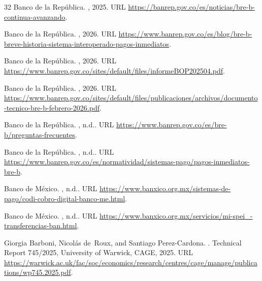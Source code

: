 \documentclass[12pt]{article}
\begin{document}
\begin{thebibliography}{32}
{Banco de la República}.
, 2025.
\newblock URL \url{https://banrep.gov.co/es/noticias/bre-b-continua-avanzando}.

{Banco de la República}.
, 2026{}.
\newblock URL \url{https://www.banrep.gov.co/es/blog/bre-b-breve-historia-sistema-interoperado-pagos-inmediatos}.

{Banco de la República}.
, 2026{}.
\newblock URL \url{https://www.banrep.gov.co/sites/default/files/informeBOP202504.pdf}.

{Banco de la República}.
, 2026{}.
\newblock URL \url{https://www.banrep.gov.co/sites/default/files/publicaciones/archivos/documento-tecnico-bre-b-febrero-2026.pdf}.

{Banco de la República}.
, n.d.{}.
\newblock URL \url{https://www.banrep.gov.co/es/bre-b/preguntas-frecuentes}.

{Banco de la República}.
, n.d.{}.
\newblock URL \url{https://www.banrep.gov.co/es/normatividad/sistemas-pago/pagos-inmediatos-bre-b}.

{Banco de México}.
, n.d.{}.
\newblock URL \url{https://www.banxico.org.mx/sistemas-de-pago/codi-cobro-digital-banco-me.html}.

{Banco de México}.
, n.d.{}.
\newblock URL \url{https://www.banxico.org.mx/servicios/mi-spei_-transferencias-ban.html}.

Giorgia Barboni, Nicolás de~Roux, and Santiago Perez-Cardona.
.
\newblock Technical Report 745/2025, University of Warwick, CAGE, 2025.
\newblock URL \url{https://warwick.ac.uk/fac/soc/economics/research/centres/cage/manage/publications/wp745.2025.pdf}.


\end{thebibliography}
\end{document}
